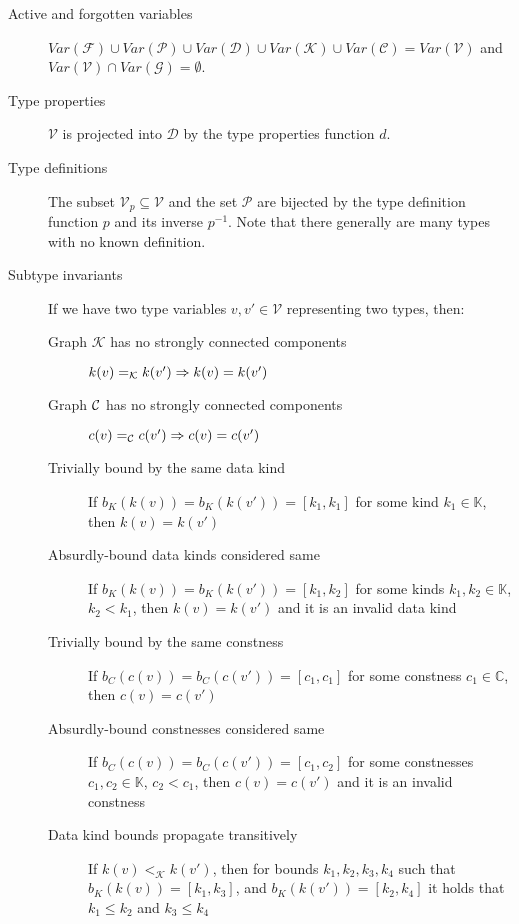 \begin{description}
    \item[Active and forgotten variables] $Var(\mathcal{F}) \cup Var(\mathcal{P}) \cup Var(\mathcal{D}) \cup Var(\mathcal{K}) \cup Var(\mathcal{C}) = Var(\mathcal{V})$ and $Var(\mathcal{V}) \cap Var(\mathcal{G}) = \emptyset$.

    \item[Type properties] $\mathcal{V}$ is projected into $\mathcal{D}$  by the type properties function $d$.

    \item[Type definitions] The subset $\mathcal{V}_p \subseteq \mathcal{V}$ and the set $\mathcal{P}$ are bijected by the type definition function $p$ and its inverse $p^{-1}$. Note that there generally are many types with no known definition.

    \item[Subtype invariants] If we have two type variables $v, v' \in \mathcal{V}$ representing two types, then:
        \begin{description}
            \item[Graph $\mathcal{K}$ has no strongly connected components] $k (v) =_{\mathcal{K}} k (v') \Rightarrow k (v) = k(v')$

            \item[Graph $\mathcal C$ has no strongly connected components] $c (v) =_{\mathcal{C}} c (v') \Rightarrow c (v) = c(v')$

            \item[Trivially bound by the same data kind] If $b_K (k (v)) = b_K (k (v')) = [k_1, k_1]$ for some kind $k_1 \in \mathbb{K}$, then $k (v) = k (v')$

            \item[Absurdly-bound data kinds considered same] If $b_K (k (v)) = b_K (k (v')) = [k_1, k_2]$ for some kinds $k_1, k_2 \in \mathbb{K}$, $k_2 < k_1$, then $k (v) = k (v')$ and it is an invalid data kind

            \item[Trivially bound by the same constness] If $b_C (c (v)) = b_C (c (v')) = [c_1, c_1]$ for some constness $c_1 \in \mathbb{C}$, then $c (v) = c (v')$

            \item[Absurdly-bound constnesses considered same] If $b_C (c (v)) = b_C (c (v')) = [c_1, c_2]$ for some constnesses $c_1, c_2 \in \mathbb{K}$, $c_2 < c_1$, then $c (v) = c (v')$ and it is an invalid constness

            \item[Data kind bounds propagate transitively] If $k (v) <_{\mathcal{K}} k (v')$, then for bounds $k_1, k_2, k_3, k_4$ such that $b_K (k (v)) = [k_1, k_3]$, and $b_K (k (v')) = [k_2, k_4]$ it holds that $k_1 \leq k_2$ and $k_3 \leq k_4$


\end{description}
\end{description}
